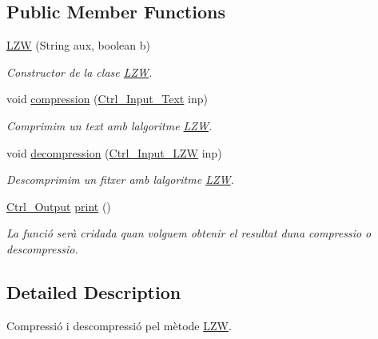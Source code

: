 \subsection*{Public Member Functions}
\begin{DoxyCompactItemize}
\item 
\hyperlink{classdomini_1_1algorithm_1_1LZW_a00bd43f0691ac9679e6232b701e535ec}{L\+ZW} (String aux, boolean b)
\begin{DoxyCompactList}\small\item\em Constructor de la clase \hyperlink{classdomini_1_1algorithm_1_1LZW}{L\+ZW}. \end{DoxyCompactList}\item 
void \hyperlink{classdomini_1_1algorithm_1_1LZW_a79ce338289c3e8fcdd111ca029cfb45b}{compression} (\hyperlink{classpersistencia_1_1input_1_1Ctrl__Input__Text}{Ctrl\+\_\+\+Input\+\_\+\+Text} inp)
\begin{DoxyCompactList}\small\item\em Comprimim un text amb l\textquotesingle{}algoritme \hyperlink{classdomini_1_1algorithm_1_1LZW}{L\+ZW}. \end{DoxyCompactList}\item 
void \hyperlink{classdomini_1_1algorithm_1_1LZW_a1c7f66a62ed475a72a49f294c41f54fa}{decompression} (\hyperlink{classpersistencia_1_1input_1_1Ctrl__Input__LZW}{Ctrl\+\_\+\+Input\+\_\+\+L\+ZW} inp)
\begin{DoxyCompactList}\small\item\em Descomprimim un fitxer amb l\textquotesingle{}algoritme \hyperlink{classdomini_1_1algorithm_1_1LZW}{L\+ZW}. \end{DoxyCompactList}\item 
\hyperlink{classpersistencia_1_1output_1_1Ctrl__Output}{Ctrl\+\_\+\+Output} \hyperlink{classdomini_1_1algorithm_1_1LZW_a57ba5129e7f26d4cc066195e3d6c9c8c}{print} ()
\begin{DoxyCompactList}\small\item\em La funció serà cridada quan volguem obtenir el resultat d\textquotesingle{}una compressio o descompressio. \end{DoxyCompactList}\end{DoxyCompactItemize}


\subsection{Detailed Description}
Compressió i descompressió pel mètode \hyperlink{classdomini_1_1algorithm_1_1LZW}{L\+ZW}. 

